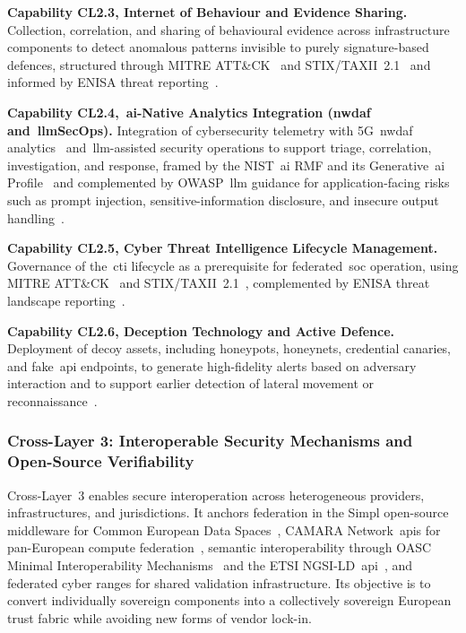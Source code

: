 \documentclass{ieeeaccess}
\begin{document}
\textbf{Capability CL2.3, Internet of Behaviour and Evidence Sharing.} Collection, correlation, and sharing of behavioural evidence across infrastructure components to detect anomalous patterns invisible to purely signature-based defences, structured through MITRE ATT\&CK~\cite{mitre2020} and STIX/TAXII~2.1~\cite{stix21,taxii21} and informed by ENISA threat reporting~\cite{enisaetl2025}.

\textbf{Capability CL2.4,~\gls{ai}-Native Analytics Integration (\acrshort{nwdaf} and~\acrshort{llm}SecOps).} Integration of cybersecurity telemetry with 5G~\gls{nwdaf} analytics~\cite{tgpp23288} and~\gls{llm}-assisted security operations to support triage, correlation, investigation, and response, framed by the NIST~\gls{ai} RMF and its Generative~\gls{ai} Profile~\cite{nistairmf,nistaigenai} and complemented by OWASP~\gls{llm} guidance for application-facing risks such as prompt injection, sensitive-information disclosure, and insecure output handling~\cite{owaspllm}.

\textbf{Capability CL2.5, Cyber Threat Intelligence Lifecycle Management.} Governance of the~\gls{cti} lifecycle as a prerequisite for federated~\gls{soc} operation, using MITRE ATT\&CK~\cite{mitre2020} and STIX/TAXII~2.1~\cite{stix21,taxii21}, complemented by ENISA threat landscape reporting~\cite{enisaetl2025}.

\textbf{Capability CL2.6, Deception Technology and Active Defence.} Deployment of decoy assets, including honeypots, honeynets, credential canaries, and fake~\gls{api} endpoints, to generate high-fidelity alerts based on adversary interaction and to support earlier detection of lateral movement or reconnaissance~\cite{mitre2020,enisaetl2025}.

\subsubsection{Cross-Layer 3: Interoperable Security Mechanisms and Open-Source Verifiability}
\label{sec:CL3}

Cross-Layer~3 enables secure interoperation across heterogeneous providers, infrastructures, and jurisdictions. It anchors federation in the Simpl open-source middleware for Common European Data Spaces~\cite{ecsimpl}, CAMARA Network~\glspl{api} for pan-European compute federation~\cite{camara2025}, semantic interoperability through OASC Minimal Interoperability Mechanisms~\cite{oascmim5} and the ETSI NGSI-LD~\gls{api}~\cite{etsingsild}, and federated cyber ranges for shared validation infrastructure. Its objective is to convert individually sovereign components into a collectively sovereign European trust fabric while avoiding new forms of vendor lock-in.
\end{document}
